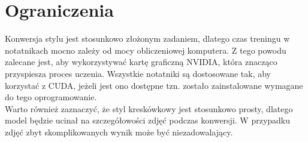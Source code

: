 \documentclass{article}
\begin{document}
\section{Ograniczenia}
Konwersja stylu jest stosunkowo złożonym zadaniem, dlatego czas treningu w notatnikach mocno zależy od mocy obliczeniowej komputera. Z tego powodu zalecane jest, aby wykorzystywać kartę graficzną NVIDIA, która znacząco przyspiesza proces uczenia. Wszystkie notatniki są dostosowane tak, aby korzystać z CUDA, jeżeli jest ono dostępne tzn. zostało zainstalowane wymagane do tego oprogramowanie.
\vspace{3mm} \\
Warto również zaznaczyć, że styl kreskówkowy jest stosunkowo prosty, dlatego model będzie ucinał na szczegółowości zdjęć podczas konwersji. W przypadku zdjęć zbyt skomplikowanych wynik może być niezadowalający.
\end{document}
